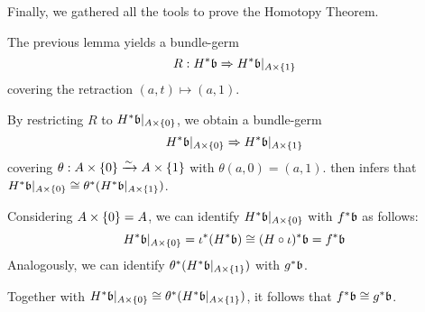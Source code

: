 \begin{myparagraph}
    Finally, we gathered all the tools to prove the Homotopy Theorem.
\end{myparagraph}

\begin{myproof}
    The previous lemma yields a bundle-germ
    \[ \germdef{R}{\ind{H}\bb}{\ind{H}\bb[\cylup{A}]} \]
    covering the retraction $(a, t) \mapsto (a, 1)$.

    By restricting $R$ to $\ind{H}\bb[\cyldown{A}]$, we obtain a bundle-germ
    \[ \germ{\ind{H}\bb[\cyldown{A}]}{\ind{H}\bb[\cylup{A}]} \]
    covering $\theta: A \times{} \{0\} \xrightarrow{\sim} A \times{} \{1\}$ with $\theta(a, 0) = (a, 1)$.
     then infers that
    $\ind{H}\bb[\cyldown{A}] \cong \ind{\theta}(\ind{H}\bb[\cylup{A}])$.
    
    Considering $A \times{} \{0\} = A$,
    we can identify $\ind{H}\bb[\cyldown{A}]$ with $\ind{f}\bb$ as follows:
    \[
        \ind{H}\bb[A \cross \{0\}] =
        \ind{\iota}(\ind{H}\bb) \cong
        \ind{(H \circ \iota)}\bb =
        \ind{f}\bb
    \]
    Analogously, we can identify
    $\ind{\theta}(\ind{H}\bb[\cylup{A}])$ with $\ind{g}\bb$.

    Together with
    $\ind{H}\bb[\cyldown{A}] \cong \ind{\theta}(\ind{H}\bb[\cylup{A}])$,
    it follows that $\ind{f}\bb \cong \ind{g}\bb$.
\end{myproof}